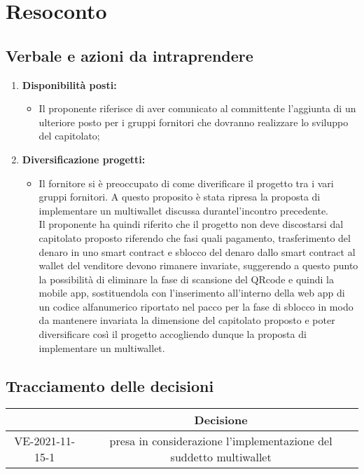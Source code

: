 \section{Resoconto}
\subsection{Verbale e azioni da intraprendere}

\begin{enumerate}
	\item \textbf{Disponibilità posti:}
	\begin{itemize}
		\item Il proponente riferisce di aver comunicato al committente l'aggiunta di un ulteriore posto per i gruppi fornitori che dovranno realizzare lo sviluppo del capitolato;
	\end{itemize}

	\item \textbf{Diversificazione progetti:}
	\begin{itemize}
		\item Il fornitore si è preoccupato di come diverificare il progetto tra i vari gruppi fornitori.
		A questo proposito è stata ripresa la proposta di implementare un multiwallet discussa durantel'incontro precedente.\\
		Il proponente ha quindi riferito che il progetto non deve discostarsi dal capitolato proposto riferendo che fasi quali pagamento, trasferimento del denaro in uno smart contract e sblocco del denaro dallo smart contract al wallet del venditore devono rimanere invariate,
		suggerendo a questo punto la possibilità di eliminare la fase di scansione del QRcode e quindi la mobile app,
		sostituendola con l'inserimento all'interno della web app di un codice alfanumerico riportato nel pacco per la fase di sblocco
		in modo da mantenere invariata la dimensione del capitolato proposto e poter diversificare così il progetto
		accogliendo dunque la proposta di implementare un multiwallet.
	\end{itemize}

	

\end{enumerate}

\pagebreak

\subsection{Tracciamento delle decisioni}

\begin{table}[H]
	\centering
	\renewcommand{\arraystretch}{1.8}
	\begin{tabular}{c | c}
		\rowcolor[HTML]{125e28}
		\multicolumn{1}{c}{\color[HTML]{FFFFFF} \textbf{ID}} &
		\multicolumn{1}{c}{\color[HTML]{FFFFFF} \textbf{Decisione}} \\
		\hline
		VE-2021-11-15-1 & presa in considerazione l'implementazione del suddetto multiwallet\\ \hline

	\end{tabular}
\end{table}